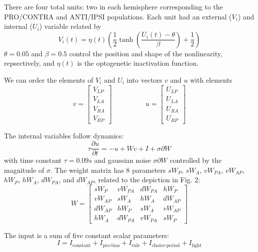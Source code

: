 \documentclass[11pt]{article}
\begin{document}
There are four total units: two in each hemisphere corresponding to the PRO/CONTRA and ANTI/IPSI populations.  Each unit had an external ($V_i$) and internal ($U_i$) variable related by
\begin{equation}
V_i(t) =\eta(t)\left(\frac{1}{2}\tanh\left(\frac{U_i(t) - \theta}{\beta}\right)+ \frac{1}{2} \right)
\end{equation}
$\theta = 0.05$ and $\beta = 0.5$ control the position and shape of the nonlinearity, repsectively, and $\eta(t)$ is the optogenetic inactivation function.

We can order the elements of $V_i$ and $U_i$ into vectors $v$ and $u$ with elements
\begin{equation}
v = \begin{bmatrix} V_{LP} \\ V_{LA} \\ V_{RA} \\ V_{RP} \end{bmatrix} \hspace{2cm} u = \begin{bmatrix} U_{LP} \\ U_{LA} \\ U_{RA} \\ U_{RP} \end{bmatrix}
\end{equation}

 The internal variables follow dynamics:
\begin{equation}
\tau \frac{\partial u}{\partial t} = -u + Wv + I + \sigma \partial W
\end{equation}
with time constant $\tau = 0.09s$ and gaussian noise $\sigma \partial W$ controlled by the magnitude of $\sigma$.  The weight matrix has 8 parameters $sW_P$, $sW_A$, $vW_{PA}$, $vW_{AP}$, $hW_P$, $hW_A$, $dW_{PA}$, and $dW_{AP}$,  related to the depiction in Fig. 2:
\begin{equation}
W = \begin{bmatrix} sW_P & vW_{PA} &  dW_{PA} & hW_P \\ vW_{AP}  & sW_A & hW_A  & dW_{AP} \\ dW_{AP} & hW_P & sW_A & vW_{AP}  \\  hW_A & dW_{PA} & vW_{PA}  & sW_P \end{bmatrix}
\end{equation}

The input is a sum of five constant scalar parameters:
\begin{equation}
I = I_{\text{constant}} + I_{\text{pro-bias}} + I_{\text{rule}} + I_{\text{choice-period}} + I_{\text{light}}
\end{equation}
\end{document}
